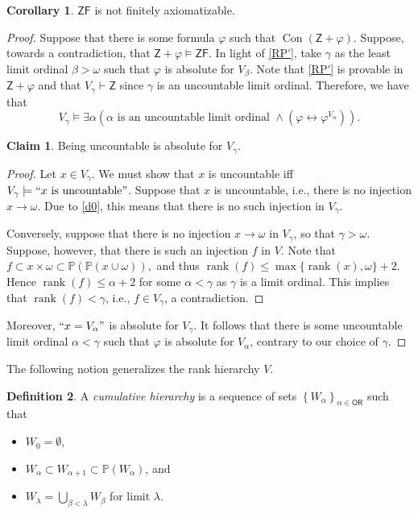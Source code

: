 \documentclass[10pt,letterpaper,cm]{nupset}
\theoremstyle{definition}
\newtheorem{definition}{Definition}[subsection]
\theoremstyle{theorem}
\newtheorem{corollary}[definition]{Corollary}
\newtheorem*{claim}{Claim}
\theoremstyle{remark}
\renewcommand{\P}{\mathbb P}
\newcommand{\1}{\mathbf{1}}
\newcommand{\0}{\vec 0}
\newcommand{\z}{\mathsf{Z}}
\newcommand{\zf}{\mathsf{ZF}}
\newcommand{\ord}{\mathsf{OR}}
\DeclareMathOperator{\rnk}{rank}
\DeclareMathOperator{\con}{Con}
\newcommand{\bi}{\begin{itemize}}
\newcommand{\ei}{\end{itemize}}
\begin{document}
\begin{corollary}
$\zf$ is not finitely axiomatizable.
\end{corollary}
\begin{proof}
Suppose that there is some formula $\varphi$ such that $\con(\z +\varphi)$. Suppose, towards a contradiction, that $\z + \varphi \models \zf$. In light of \cref{RP'}, take $\gamma$ as the least limit ordinal $\beta >\omega$ such that $\varphi$ is absolute for $V_{\beta}$. Note that \cref{RP'} is provable in $\z + \varphi$ and that $V_{\gamma} \vdash \z$ since $\gamma$ is an uncountable limit ordinal. Therefore, we have that 
\[ V_{\gamma} \models \exists{\alpha}\left(\alpha \text{ is an uncountable limit ordinal } \land \left(\varphi \leftrightarrow \varphi^{V_{\alpha}}\right)\right) .\]
\begin{claim}
Being uncountable is absolute for $V_{\gamma}$.
\end{claim}
\begin{proof}
Let $x\in V_{\gamma}$. We must show that $x$ is uncountable iff $V_{\gamma} \models ``x \text{ is uncountable}"$. Suppose that $x$ is uncountable, i.e., there is no injection $x \to \omega$. Due to \cref{d0},  this means that there is no such injection in $V_{\gamma}$. 
\smallskip

Conversely, suppose that there is no injection $x \to \omega$ in $V_{\gamma}$, so that $\gamma > \omega$. Suppose, however, that there is such an injection $f$ in $V$. Note that $f\subset x\times \omega \subset \P(\P(x \cup \omega)),$ and thus $\rnk(f)\leq \max\{\rnk(x), \omega\} +2$. Hence $\rnk(f)\leq \alpha +2$ for some $\alpha <\gamma$ as $\gamma$ is a limit ordinal. This implies that $\rnk(f) <\gamma$, i.e., $f\in V_{\gamma}$, a contradiction.
\end{proof}
 Moreover, $``x= V_{\alpha}"$ is absolute for $V_{\gamma}$. It follows that there is some uncountable limit ordinal $\alpha < \gamma$ such that $\varphi$ is absolute for $V_{\alpha}$, contrary to our choice of $\gamma$.
\end{proof}

\smallskip

The following notion generalizes the rank hierarchy $V$.

\begin{definition}
A \textit{cumulative hierarchy} is a sequence of sets $\left\{W_{\alpha}\right\}_{\alpha \in \ord}$ such that
\bi
\item $W_0 =\emptyset$,
\item $W_{\alpha} \subset W_{\alpha +1}\subset \P(W_{\alpha})$, and
\item $W_{\lambda} = \bigcup_{\beta < \lambda} W_{\beta}$ for limit $\lambda$.
\ei 
\end{definition}
\end{document}
